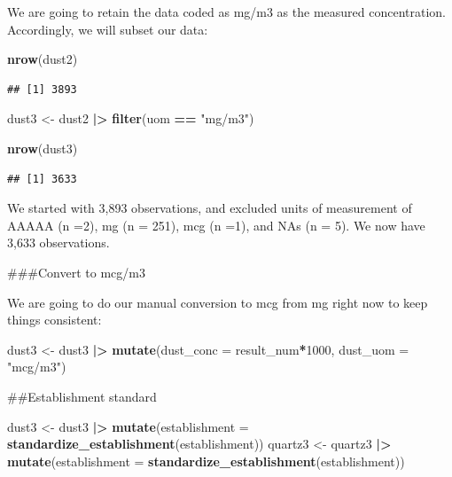 \documentclass[
]{article}
\newenvironment{Shaded}{\begin{snugshade}}{\end{snugshade}}
\newcommand{\AttributeTok}[1]{\textcolor[rgb]{0.13,0.29,0.53}{#1}}
\newcommand{\DecValTok}[1]{\textcolor[rgb]{0.00,0.00,0.81}{#1}}
\newcommand{\FunctionTok}[1]{\textcolor[rgb]{0.13,0.29,0.53}{\textbf{#1}}}
\newcommand{\NormalTok}[1]{#1}
\newcommand{\OtherTok}[1]{\textcolor[rgb]{0.56,0.35,0.01}{#1}}
\newcommand{\SpecialCharTok}[1]{\textcolor[rgb]{0.81,0.36,0.00}{\textbf{#1}}}
\newcommand{\StringTok}[1]{\textcolor[rgb]{0.31,0.60,0.02}{#1}}
\begin{document}
We are going to retain the data coded as mg/m3 as the measured
concentration. Accordingly, we will subset our data:

\begin{Shaded}
\begin{Highlighting}[]
\FunctionTok{nrow}\NormalTok{(dust2) }
\end{Highlighting}
\end{Shaded}

\begin{verbatim}
## [1] 3893
\end{verbatim}

\begin{Shaded}
\begin{Highlighting}[]
\NormalTok{dust3 }\OtherTok{\textless{}{-}}\NormalTok{ dust2 }\SpecialCharTok{|\textgreater{}} 
  \FunctionTok{filter}\NormalTok{(uom }\SpecialCharTok{==} \StringTok{"mg/m3"}\NormalTok{) }

\FunctionTok{nrow}\NormalTok{(dust3)}
\end{Highlighting}
\end{Shaded}

\begin{verbatim}
## [1] 3633
\end{verbatim}

We started with 3,893 observations, and excluded units of measurement of
AAAAA (n =2), mg (n = 251), mcg (n =1), and NAs (n = 5). We now have
3,633 observations.

\#\#\#Convert to mcg/m3

We are going to do our manual conversion to mcg from mg right now to
keep things consistent:

\begin{Shaded}
\begin{Highlighting}[]
\NormalTok{dust3 }\OtherTok{\textless{}{-}}\NormalTok{ dust3 }\SpecialCharTok{|\textgreater{}} 
  \FunctionTok{mutate}\NormalTok{(}\AttributeTok{dust\_conc =}\NormalTok{ result\_num}\SpecialCharTok{*}\DecValTok{1000}\NormalTok{,}
         \AttributeTok{dust\_uom =} \StringTok{"mcg/m3"}\NormalTok{) }
\end{Highlighting}
\end{Shaded}

\#\#Establishment standard

\begin{Shaded}
\begin{Highlighting}[]
\NormalTok{dust3 }\OtherTok{\textless{}{-}}\NormalTok{ dust3 }\SpecialCharTok{|\textgreater{}} \FunctionTok{mutate}\NormalTok{(}\AttributeTok{establishment =} \FunctionTok{standardize\_establishment}\NormalTok{(establishment))}
\NormalTok{quartz3 }\OtherTok{\textless{}{-}}\NormalTok{ quartz3 }\SpecialCharTok{|\textgreater{}} \FunctionTok{mutate}\NormalTok{(}\AttributeTok{establishment =} \FunctionTok{standardize\_establishment}\NormalTok{(establishment))}
\end{Highlighting}
\end{Shaded}
\end{document}
